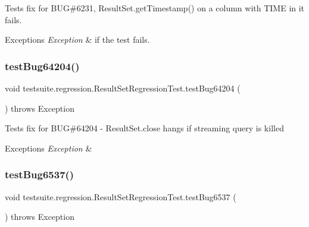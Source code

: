 Tests fix for B\+UG\#6231, Result\+Set.\+get\+Timestamp() on a column with T\+I\+ME in it fails.


\begin{DoxyExceptions}{Exceptions}
{\em Exception} & if the test fails. \\
\hline
\end{DoxyExceptions}
\mbox{\label{classtestsuite_1_1regression_1_1_result_set_regression_test_a4c82635b5ff90ca43310f0523bf0b8a5}} 
\subsubsection{\texorpdfstring{test\+Bug64204()}{testBug64204()}}
{\footnotesize\ttfamily void testsuite.\+regression.\+Result\+Set\+Regression\+Test.\+test\+Bug64204 (\begin{DoxyParamCaption}{ }\end{DoxyParamCaption}) throws Exception}

Tests fix for B\+UG\#64204 -\/ Result\+Set.\+close hangs if streaming query is killed


\begin{DoxyExceptions}{Exceptions}
{\em Exception} & \\
\hline
\end{DoxyExceptions}
\mbox{\label{classtestsuite_1_1regression_1_1_result_set_regression_test_abe87e577ef06bd6b70aa3f685177c272}} 
\subsubsection{\texorpdfstring{test\+Bug6537()}{testBug6537()}}
{\footnotesize\ttfamily void testsuite.\+regression.\+Result\+Set\+Regression\+Test.\+test\+Bug6537 (\begin{DoxyParamCaption}{ }\end{DoxyParamCaption}) throws Exception}

